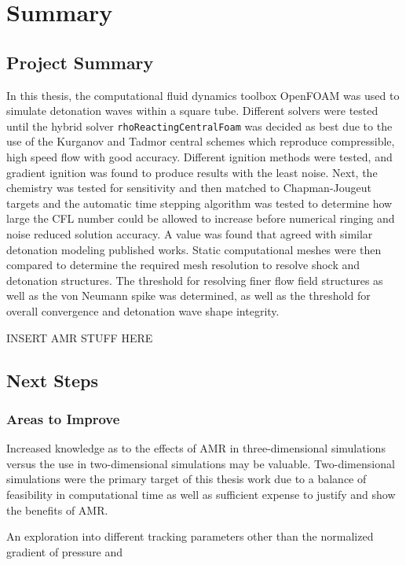\chapter{Summary}
\label{summary}

\section{Project Summary}
In this thesis, the computational fluid dynamics toolbox OpenFOAM was used to simulate detonation waves within a square tube. Different solvers were tested until the hybrid solver \verb|rhoReactingCentralFoam| was decided as best due to the use of the Kurganov and Tadmor central schemes which reproduce compressible, high speed flow with good accuracy. Different ignition methods were tested, and gradient ignition was found to produce results with the least noise. Next, the chemistry was tested for sensitivity and then matched to Chapman-Jougeut targets and the automatic time stepping algorithm was tested to determine how large the CFL number could be allowed to increase before numerical ringing and noise reduced solution accuracy. A value was found that agreed with similar detonation modeling published works. Static computational meshes were then compared to determine the required mesh resolution to resolve shock and detonation structures. The threshold for resolving finer flow field structures as well as the von Neumann spike was determined, as well as the threshold for overall convergence and detonation wave shape integrity. 

INSERT AMR STUFF HERE




\section{Next Steps}
\subsection{Areas to Improve}
Increased knowledge as to the effects of AMR in three-dimensional simulations versus the use in two-dimensional simulations may be valuable. Two-dimensional simulations were the primary target of this thesis work due to a balance of feasibility in computational time as well as sufficient expense to justify and show the benefits of AMR. 

An exploration into different tracking parameters other than the normalized gradient of pressure and 

